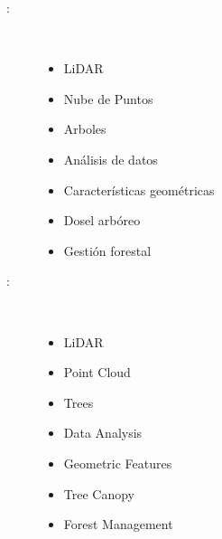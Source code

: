 \begin{multicols}{2}
\begin{description}
\item [\palabraschaveprincipal:] \mbox{} \\[-20pt]
    \begin{itemize}
        \item LiDAR
        \item Nube de Puntos
        \item Arboles
        \item Análisis de datos 
        \item Características geométricas
        \item Dosel arbóreo
        \item Gestión forestal
    \end{itemize} 
\end{description}
\begin{description}
\item [\palabraschavesecundaria:] \mbox{} \\[-20pt]
    \begin{itemize}
        \item LiDAR
        \item Point Cloud
        \item Trees
        \item Data Analysis
        \item Geometric Features
        \item Tree Canopy
        \item Forest Management
    \end{itemize}
\end{description}
\end{multicols}
